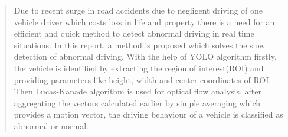 \begin{abstract}

Due to recent surge in road accidents due to negligent driving of one vehicle driver which costs loss in life and property there is a need for an efficient and quick method to detect abnormal driving in real time situations. In this report, a method is proposed which solves the slow detection of abnormal driving. With the help of  YOLO algorithm firstly, the vehicle is identified by extracting the region of interest(ROI) and providing parameters like height, width and center coordinates of ROI. Then Lucas-Kanade algorithm is used for optical flow analysis, after aggregating the vectors calculated earlier by simple averaging which provides a motion vector, the driving behaviour of a vehicle is classified as abnormal or normal. 
\end{abstract}
